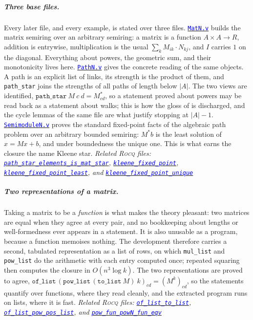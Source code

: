 \documentclass[a4paper,UKenglish,cleveref,autoref,thm-restate,anonymous]{lipics-v2021}
\newcommand{\Mstar}{M^{\ast}}
\newcommand{\rocq}{\textsc{Rocq}}
\newcommand{\anonrepo}{https://anonymous.4open.science/r/Semiring_graph_algorithm-000E}
\newcommand{\rocqfile}[2]{\href{\anonrepo/#1}{\textcolor{blue}{\texttt{#2}}}}
\newcommand{\rocqrelated}[1]{{\footnotesize\itshape Related \rocq{} files: #1}}
\begin{document}
\subparagraph*{Three base files.}
Every later file, and every example, is stated over three files.
\rocqfile{algorithm/MatN.v}{MatN.v} builds the matrix semiring over an
arbitrary semiring: a matrix is a function $A \times A \to R$, addition is
entrywise, multiplication is the usual $\sum_k M_{ik}\cdot N_{kj}$, and $I$
carries $1$ on the diagonal. Everything about powers, the geometric sum,
and their monotonicity lives here.
\rocqfile{algorithm/PathN.v}{PathN.v} gives the concrete reading of the
same objects. A path is an explicit list of links, its strength is the
product of them, and \texttt{path\_star} joins the strengths of all paths
of length below $|A|$. The two views are identified,
$\texttt{path\_star}\ M\ c\ d = \Mstar_{cd}$, so a statement proved about
powers may be read back as a statement about walks; this is how the gloss
of  is discharged, and the cycle lemmas of the same file
are what justify stopping at $|A| - 1$.
\rocqfile{algorithm/SemimoduleN.v}{SemimoduleN.v} proves the standard
fixed-point facts of the algebraic path problem over an arbitrary bounded
semiring: $\Mstar b$ is the least solution of $x = M x + b$, and under
boundedness the unique one. This is what earns the closure the name
Kleene star.
\rocqrelated{\rocqfile{algorithm/SchulzeDefsN.v}{path\_star\_\allowbreak elements\_is\_mat\_star},
\rocqfile{algorithm/SemimoduleN.v}{kleene\_fixed\_point},
\rocqfile{algorithm/SemimoduleN.v}{kleene\_fixed\_\allowbreak point\_least}, and
\rocqfile{algorithm/SemimoduleN.v}{kleene\_fixed\_\allowbreak point\_unique}}

\subparagraph*{Two representations of a matrix.}
Taking a matrix to be a \emph{function} is what makes the theory pleasant:
two matrices are equal when they agree at every pair, and no bookkeeping
about lengths or well-formedness ever appears in a statement. It is also
unusable as a program, because a function memoises nothing. The
development therefore carries a second, tabulated representation as a list
of rows, on which \texttt{mul\_list} and \texttt{pow\_list} do the
arithmetic with each entry computed once; repeated squaring then computes
the closure in $O(n^{3}\log k)$. The two representations are proved to
agree, $\texttt{of\_list}\,(\texttt{pow\_list}\,(\texttt{to\_list}\ M)\ k)_{cd}
= (M^{k})_{cd}$, so the statements quantify over functions, where they read
cleanly, and the extracted program runs on lists, where it is fast.
\rocqrelated{\rocqfile{algorithm/MatN.v}{of\_list\_\allowbreak to\_list},
\rocqfile{algorithm/MatN.v}{of\_list\_\allowbreak pow\_pos\_list}, and
\rocqfile{algorithm/MatN.v}{pow\_fun\_\allowbreak powN\_fun\_eqv}}
\end{document}
